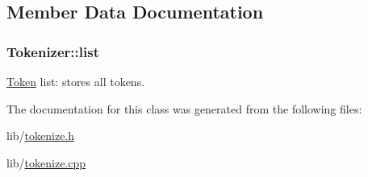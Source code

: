 \subsection{Member Data Documentation}
\hypertarget{class_tokenizer_a82d276b4b3ec47adbadd612129b7c65a}{
\subsubsection[{list}]{ Tokenizer\-::list}}\label{class_tokenizer_a82d276b4b3ec47adbadd612129b7c65a}
\hyperlink{class_token}{Token} list\-: stores all tokens. 

The documentation for this class was generated from the following files\-:\begin{DoxyCompactItemize}
\item 
lib/\hyperlink{tokenize_8h}{tokenize.\-h}\item 
lib/\hyperlink{tokenize_8cpp}{tokenize.\-cpp}\end{DoxyCompactItemize}
